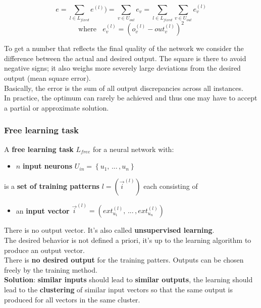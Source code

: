 \documentclass[11pt]{article}
\begin{document}
		$$ e = \sum_{l \in L_{fixed}} e^{(l)} ) = \sum_{v \in U_{out}} e_v = \sum_{l \in L_{fixed}} \sum_{v \in U_{out}} e_v^{(l)} $$
		$$ \text{where } \;\; e_v^{(l)} = \left(o_v^{(l)} - out_v^{(l)}\right)^2 $$
		
		To get a number that reflects the final quality of the network we consider the difference between the actual and desired output. The square is there to avoid negative signs; it also weighs more severely large deviations from the desired output (mean square error).\\
		Basically, the error is the sum of all output discrepancies across all instances.\\
		In practice, the optimum can rarely be achieved and thus one may have to accept a partial or approximate solution.
		
		\newpage
		
		\subsubsection{Free learning task}
		A \textbf{free learning task} $L_{free}$ for a neural network with: 
		\begin{itemize}
			\item $n$ \textbf{input neurons} $U_{in} = \left\{u_1, \, ... \, , u_n\right\}$ 
		\end{itemize}
		is a \textbf{set of training patterns} $l = \left(\vec{i}^{(l)}\right)$ each consisting of
		\begin{itemize}
			\item an \textbf{input vector} $\vec{i}^{(l)} = \left(ext_{u_1}^{(l)}, \, ... \, , ext_{u_n}^{(l)}\right)$
		\end{itemize}
		
		There is no output vector. It's also called \textbf{unsupervised learning}.\\
		The desired behavior is not defined a priori, it's up to the learning algorithm to produce an output vector.\\
		
		There is \textbf{no desired output} for the training patters. Outputs can be chosen freely by the training method.\\
		
		\textbf{Solution}: \textbf{similar inputs} should lead to \textbf{similar outputs}, the learning should lead to the \textbf{clustering} of similar input vectors so that the same output is produced for all vectors in the same cluster.\\
		
\end{document}
